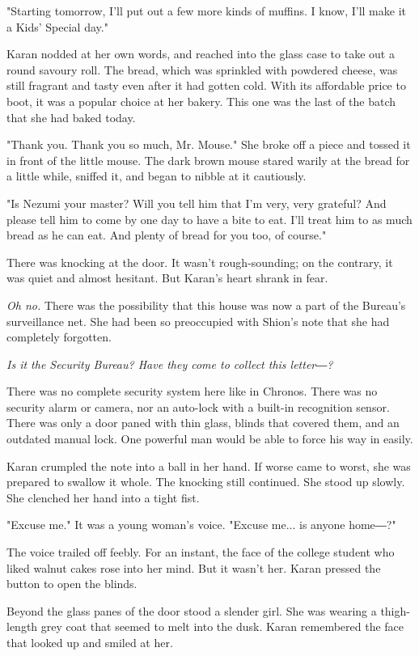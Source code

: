 "Starting tomorrow, I'll put out a few more kinds of muffins. I know,
I'll make it a Kids' Special day."

Karan nodded at her own words, and reached into the glass case to take
out a round savoury roll. The bread, which was sprinkled with powdered
cheese, was still fragrant and tasty even after it had gotten cold. With
its affordable price to boot, it was a popular choice at her bakery.
This one was the last of the batch that she had baked today.

"Thank you. Thank you so much, Mr. Mouse." She broke off a piece and
tossed it in front of the little mouse. The dark brown mouse stared
warily at the bread for a little while, sniffed it, and began to nibble
at it cautiously.

"Is Nezumi your master? Will you tell him that I'm very, very grateful?
And please tell him to come by one day to have a bite to eat. I'll treat
him to as much bread as he can eat. And plenty of bread for you too, of
course."

There was knocking at the door. It wasn't rough-sounding; on the
contrary, it was quiet and almost hesitant. But Karan's heart shrank in
fear.

\emph{Oh no.} There was the possibility that this house was now a part of the
Bureau's surveillance net. She had been so preoccupied with Shion's note
that she had completely forgotten.

\emph{Is it the Security Bureau? Have they come to collect this letter―?}

There was no complete security system here like in Chronos. There was no
security alarm or camera, nor an auto-lock with a built-in recognition
sensor. There was only a door paned with thin glass, blinds that covered
them, and an outdated manual lock. One powerful man would be able to
force his way in easily.

Karan crumpled the note into a ball in her hand. If worse came to worst,
she was prepared to swallow it whole. The knocking still continued. She
stood up slowly. She clenched her hand into a tight fist.

"Excuse me." It was a young woman's voice. "Excuse me... is anyone
home―?"

The voice trailed off feebly. For an instant, the face of the college
student who liked walnut cakes rose into her mind. But it wasn't her.
Karan pressed the button to open the blinds.

Beyond the glass panes of the door stood a slender girl. She was wearing
a thigh-length grey coat that seemed to melt into the dusk. Karan
remembered the face that looked up and smiled at her.

